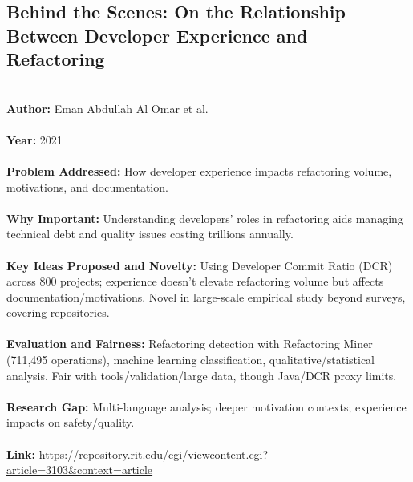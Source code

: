 \documentclass[12pt]{article}
\begin{document}
\subsection*{Behind the Scenes: On the Relationship Between Developer Experience and Refactoring}
\\
\textbf{Author:} Eman Abdullah Al Omar et al. \\
\\
\textbf{Year:} 2021 \\
\\
\textbf{Problem Addressed:} How developer experience impacts refactoring volume, motivations, and documentation. \\
\\
\textbf{Why Important:} Understanding developers’ roles in refactoring aids managing technical debt and quality issues costing trillions annually. \\
\\
\textbf{Key Ideas Proposed and Novelty:} Using Developer Commit Ratio (DCR) across 800 projects; experience doesn’t elevate refactoring volume but affects documentation/motivations. Novel in large-scale empirical study beyond surveys, covering repositories. \\
\\
\textbf{Evaluation and Fairness:} Refactoring detection with Refactoring Miner (711,495 operations), machine learning classification, qualitative/statistical analysis. Fair with tools/validation/large data, though Java/DCR proxy limits. \\
\\
\textbf{Research Gap:} Multi-language analysis; deeper motivation contexts; experience impacts on safety/quality. \\
\\
\textbf{Link:} \url{https://repository.rit.edu/cgi/viewcontent.cgi?article=3103&context=article}
\pagebreak

\end{document}
